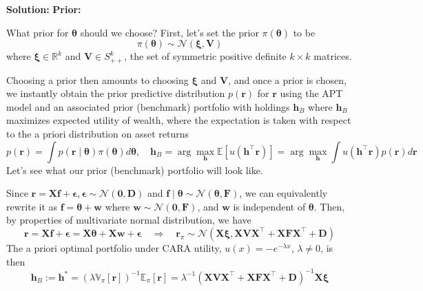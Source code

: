 \documentclass[11pt]{article}
\theoremstyle{plain} %
\newenvironment{solution}
{\color{C2}\normalfont\begin{framed}\begingroup\textbf{Solution:} }
  {\endgroup\end{framed}}
\theoremstyle{remark}
\newcommand{\EE}{\mathbb{E}}
\begin{document}
\begin{solution}
  \textbf{Prior:}

  What prior for $\boldsymbol{\theta}$ should we choose?
  First, let's set the prior $\pi(\boldsymbol{\theta})$ to be
  $$
    \pi(\boldsymbol{\theta}) \sim \mathcal{N}(\boldsymbol{\xi}, \boldsymbol{V})
  $$
  where $\boldsymbol{\xi} \in \mathbb{R}^k$ and $\boldsymbol{V} \in S_{++}^k$, the
  set of symmetric positive definite $k \times k$ matrices.

  Choosing a prior then amounts to choosing $\boldsymbol{\xi}$ and $\boldsymbol{V}$, and once
  a prior is chosen, we instantly obtain the prior predictive distribution $p(\boldsymbol{r})$ for $\boldsymbol{r}$ using the APT model and
  an associated prior (benchmark) portfolio with holdings $\boldsymbol{h}_B$
  where $\boldsymbol{h}_B$ maximizes expected utility of wealth, where the expectation
  is taken with respect to the a priori distribution on asset returns
  $$
    p(\boldsymbol{r})=\int p(\boldsymbol{r} \mid \boldsymbol{\theta}) \pi(\boldsymbol{\theta}) d \boldsymbol{\theta},
    \quad \boldsymbol{h}_B = \arg \max_{\boldsymbol{h}} \EE\left[u\left(\boldsymbol{h}^\top\boldsymbol{r}\right)\right]
    = \arg \max_{\boldsymbol{h}} \int u\left(\boldsymbol{h}^\top \boldsymbol{r}\right) p(\boldsymbol{r}) d \boldsymbol{r}
  $$
  Let's see what our prior (benchmark) portfolio will look like.

  Since $\boldsymbol{r}=\boldsymbol{X} \boldsymbol{f}+\boldsymbol{\epsilon},
    \boldsymbol{\epsilon}\sim \mathcal{N}\left(\boldsymbol{0}, \boldsymbol{D}\right)$ and $\boldsymbol{f}\mid\boldsymbol{\theta} \sim \mathcal{N}\left(\boldsymbol{\theta}, \boldsymbol{F}\right)$,
  we can equivalently rewrite it as $\boldsymbol{f} = \boldsymbol{\theta} + \boldsymbol{w}$
  where $\boldsymbol{w} \sim \mathcal{N}\left(\boldsymbol{0}, \boldsymbol{F}\right)$, and $\boldsymbol{w}$ is independent of $\boldsymbol{\theta}$.
  Then, by properties of multivariate normal distribution, we have
  $$
    \boldsymbol{r}=\boldsymbol{X} \boldsymbol{f}+\boldsymbol{\epsilon} =
    \boldsymbol{X} \boldsymbol{\theta}+\boldsymbol{X} \boldsymbol{w}+\boldsymbol{\epsilon}\quad
    \Longrightarrow \quad \boldsymbol{r}_{\pi} \sim \mathcal{N}\left(\boldsymbol{X}\boldsymbol{\xi}, \boldsymbol{X}\boldsymbol{V}\boldsymbol{X}^\top + \boldsymbol{X}\boldsymbol{F}\boldsymbol{X}^\top + \boldsymbol{D}\right)
  $$
  The a priori optimal portfolio under CARA utility, $u(x) = -e^{-\lambda x}$, $\lambda \ne 0$, is then
  $$
    \boldsymbol{h}_B:=\boldsymbol{h}^*
    =\left(\lambda \mathbb{V}_\pi[\boldsymbol{r}]\right)^{-1} \mathbb{E}_\pi[\boldsymbol{r}]
    =\lambda^{-1} \left(\boldsymbol{X}\boldsymbol{V}\boldsymbol{X}^\top + \boldsymbol{X}\boldsymbol{F}\boldsymbol{X}^\top + \boldsymbol{D}\right)^{-1} \boldsymbol{X}\boldsymbol{\xi}
  $$


\end{solution}
\end{document}
